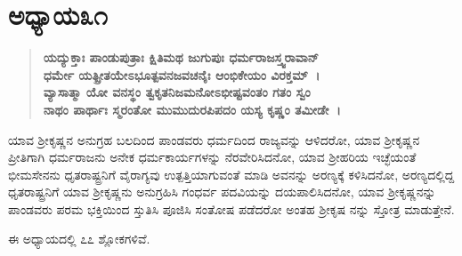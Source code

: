 \vspace{-.2cm}

\section*{ಅಧ್ಯಾಯ\enginline{-}೩೧}

\begin{verse}
\textbf{ಯದ್ಯುಕ್ತಾಃ ಪಾಂಡುಪುತ್ರಾಃ ಕ್ಷಿತಿಮಥ ಜುಗುಪುಃ ಧರ್ಮರಾಜಸ್ತ್ವರಾವಾನ್} \\\textbf{ಧರ್ಮೇ ಯತ್ಪ್ರೀತಯೇಽಭೂತ್ಪವನಜವಚನೈಃ ಆಂಭಿಕೇಯಂ ವಿರಕ್ತಮ್~।}\\\textbf{ವ್ಯಾಸಾತ್ಮಾ ಯೋ ವನಸ್ಥಂ ತ್ವಕೃತನಿಜಮನೋಽಭೀಷ್ಟವಂತಂ ಗತಂ ಸ್ವಂ}\\\textbf{ನಾಥಂ ಪಾರ್ಥಾಃ ಸ್ಮರಂತೋ ಮುಮುದುರಪಿಪದಂ ಯಸ್ಯ ಕೃಷ್ಣಂ ತಮೀಡೇ~।}
\end{verse}

ಯಾವ ಶ‍್ರೀಕೃಷ್ಣನ ಅನುಗ್ರಹ ಬಲದಿಂದ ಪಾಂಡವರು ಧರ್ಮದಿಂದ ರಾಜ್ಯವನ್ನು ಆಳಿದರೋ, ಯಾವ ಶ‍್ರೀಕೃಷ್ಣನ ಪ್ರೀತಿಗಾಗಿ ಧರ್ಮರಾಜನು ಅನೇಕ ಧರ್ಮಕಾರ್ಯಗಳನ್ನು ನೆರವೇರಿಸಿದನೋ, ಯಾವ ಶ‍್ರೀಹರಿಯ ಇಚ್ಛೆಯಂತೆ ಭೀಮಸೇನನು ಧೃತರಾಷ್ಟ್ರನಿಗೆ ವೈರಾಗ್ಯವು ಉತ್ಪತ್ತಿಯಾಗುವಂತೆ ಮಾಡಿ ಅವನನ್ನು ಅರಣ್ಯಕ್ಕೆ ಕಳಿಸಿದನೋ, ಅರಣ್ಯದಲ್ಲಿದ್ದ ಧೃತರಾಷ್ಟ್ರನಿಗೆ ಯಾವ ಶ‍್ರೀಕೃಷ್ಣನು ಅನುಗ್ರಹಿಸಿ ಗಂಧರ್ವ ಪದವಿಯನ್ನು ದಯಪಾಲಿಸಿದನೋ, ಯಾವ ಶ‍್ರೀಕೃಷ್ಣನನ್ನು ಪಾಂಡವರು ಪರಮ ಭಕ್ತಿಯಿಂದ ಸ್ತುತಿಸಿ ಪೂಜಿಸಿ ಸಂತೋಷ ಪಡೆದರೋ ಅಂತಹ ಶ‍್ರೀಕೃಷ ನನ್ನು ಸ್ತೋತ್ರ ಮಾಡುತ್ತೇನೆ.

ಈ ಅಧ್ಯಾಯದಲ್ಲಿ ೭೭ ಶ್ಲೋಕಗಳಿವೆ.

